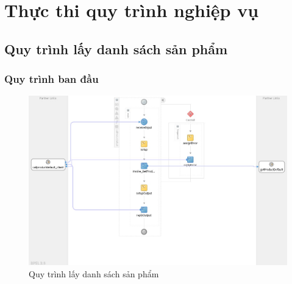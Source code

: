 \section{Thực thi quy trình nghiệp vụ}

\subsection{Quy trình lấy danh sách sản phẩm}

\subsubsection*{Quy trình ban đầu}
\begin{figure}[!htp]
    \centering
    \includegraphics[width=12cm]{img/bpel/productDefault.jpg}
    \newline
    \caption{Quy trình lấy danh sách sản phẩm}
\end{figure}

